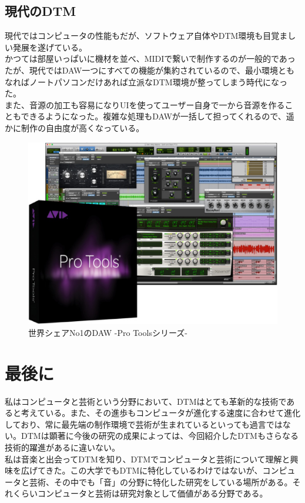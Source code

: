 \documentclass[ams]{U-AizuGT}
\begin{document}
\subsection{現代のDTM}
現代ではコンピュータの性能もだが、ソフトウェア自体やDTM環境も目覚ましい発展を遂げている。\\
かつては部屋いっぱいに機材を並べ、MIDIで繋いで制作するのが一般的であったが、現代ではDAW一つにすべての機能が集約されているので、最小環境ともなればノートパソコンだけあれば立派なDTM環境が整ってしまう時代になった。\\
また、音源の加工も容易になりUIを使ってユーザー自身で一から音源を作ることもできるようになった。複雑な処理もDAWが一括して担ってくれるので、遥かに制作の自由度が高くなっている。\\
\begin{figure}[htbp]
  \begin{center}
    \includegraphics[scale=0.2]{./protools.eps}
    \caption{世界シェアNo1のDAW -Pro Toolsシリーズ-}
    \label{fig:protools}
  \end{center}
\end{figure}
\section{最後に}
私はコンピュータと芸術という分野において、DTMはとても革新的な技術であると考えている。また、その進歩もコンピュータが進化する速度に合わせて進化しており、常に最先端の制作環境で芸術が生まれているといっても過言ではない。DTMは顕著に今後の研究の成果によっては、今回紹介したDTMもさらなる技術的躍進があるに違いない。\\
私は音楽と出会ってDTMを知り、DTMでコンピュータと芸術について理解と興味を広げてきた。この大学でもDTMに特化しているわけではないが、コンピュータと芸術、その中でも「音」の分野に特化した研究をしている場所がある。それくらいコンピュータと芸術は研究対象として価値がある分野である。\\


\end{document}
